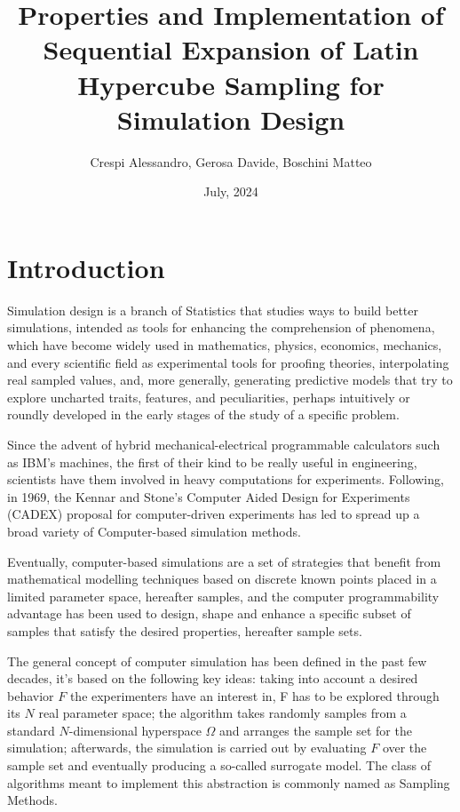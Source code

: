 \documentclass{article}
\begin{document}
\title{Properties and Implementation of Sequential Expansion of Latin Hypercube Sampling for Simulation Design}
\author{Crespi Alessandro, Gerosa Davide, Boschini Matteo}
\date{July, 2024}
\maketitle


\section{Introduction}
Simulation design is a branch of Statistics that studies ways to build better simulations, intended as tools for enhancing the comprehension of phenomena, which have become widely used in mathematics, physics, economics, mechanics, and every scientific field as experimental tools for proofing theories, interpolating real sampled values, and, more generally, generating predictive models that try to explore uncharted traits, features, and peculiarities, perhaps intuitively or roundly developed in the early stages of the study of a specific problem.

Since the advent of hybrid mechanical-electrical programmable calculators such as IBM's machines, the first of their kind to be really useful in engineering, scientists have them involved in heavy computations for experiments. Following, in 1969, the Kennar and Stone's Computer Aided Design for Experiments (CADEX) proposal for computer-driven experiments has led to spread up a broad variety of Computer-based simulation methods.

Eventually, computer-based simulations are a set of strategies that benefit from mathematical modelling techniques based on discrete known points placed in a limited parameter space, hereafter samples, and the computer programmability advantage has been used to design, shape and enhance a specific subset of samples that satisfy the desired properties, hereafter sample sets. 

The general concept of computer simulation has been defined in the past few decades, it's based on the following key ideas: taking into account a desired behavior $ F $ the experimenters have an interest in, F has to be explored through its $ N $ real parameter space; the algorithm takes randomly samples from a standard $ N $-dimensional hyperspace $ \Omega $ and arranges the sample set for the simulation; afterwards, the simulation is carried out by evaluating $ F $ over the sample set and eventually producing a so-called surrogate model. The class of algorithms meant to implement this abstraction is commonly named as Sampling Methods.
\end{document}
